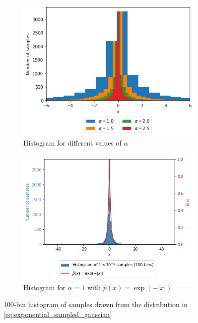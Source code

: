 \documentclass[a4paper]{article}
\begin{document}
\begin{figure}[h]
    \centering
    \begin{subfigure}[b]{0.45\textwidth}
        \centering
        \includegraphics[width=\textwidth]{figures/exponential_sampled_gaussian.png}
        \caption{Histogram for different values of $\alpha$}
        \label{fig:exponential_sampled_gaussian_histogram}
    \end{subfigure}
    \hfill
    \centering
    \begin{subfigure}[b]{0.45\textwidth}
        \centering
        \includegraphics[width=\textwidth]{figures/exponential_sampled_gaussian_with_pdf.png}
        \caption{Histogram for $\alpha=1$ with $\hat{p}(x) = \exp(-|x|)$}
        \label{fig:exponential_sampled_gaussian_histogram_with_pdf}
    \end{subfigure}
    \caption{100-bin histogram of samples drawn from the distribution in \autoref{eq:exponential_sampled_gaussian}}
    \label{fig:exponential_sampled_gaussian}
\end{figure}
\end{document}
